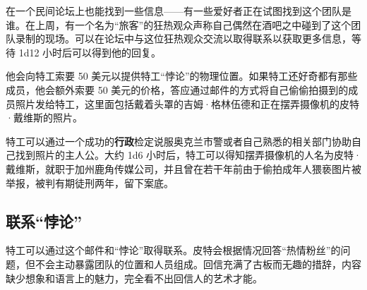 在一个民间论坛上也能找到一些信息——有一些爱好者正在试图找到这个团队是谁。在上周，有一个名为“旅客”的狂热观众声称自己偶然在酒吧之中碰到了这个团队录制的现场。可以在论坛中与这位狂热观众交流以取得联系以获取更多信息，等待 1d12 小时后可以得到他的回复。

他会向特工索要 50 美元以提供特工“悖论”的物理位置。如果特工还好奇都有那些成员，他会额外索要 50 美元的价格，答应通过邮件的方式将自己偷偷拍摄到的成员照片发给特工，这里面包括戴着头罩的吉姆·格林伍德和正在摆弄摄像机的皮特·戴维斯的照片。

特工可以通过一个成功的\textbf{行政}检定说服奥克兰市警或者自己熟悉的相关部门协助自己找到照片的主人公。大约 1d6 小时后，特工可以得知摆弄摄像机的人名为皮特·戴维斯，就职于加州鹿角传媒公司，并且曾在若干年前由于偷拍成年人猥亵图片被举报，被判有期徒刑两年，留下案底。

\subsection{联系“悖论”}
特工可以通过这个邮件和“悖论”取得联系。皮特会根据情况回答“热情粉丝”的问题，但不会主动暴露团队的位置和人员组成。回信充满了古板而无趣的措辞，内容缺少想象和语言上的魅力，完全看不出回信人的艺术才能。